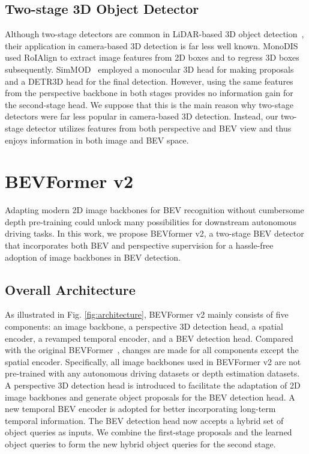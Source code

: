 \documentclass[10pt,twocolumn,letterpaper]{article}
\begin{document}
\subsection{Two-stage 3D Object Detector}
Although two-stage detectors are common in LiDAR-based 3D object detection~\cite{MV3D,AVOD,centerpoint,lidar-rcnn,frustum-pointnet,transfusion,SimMOD}, their application in camera-based 3D detection is far less well known. 
MonoDIS~\cite{MonoDIS} used RoIAlign to extract image features from 2D boxes and to regress 3D boxes subsequently.
SimMOD~\cite{SimMOD} employed a monocular 3D head for making proposals and a DETR3D \cite{DETR3D} head for the final detection.
However, using the same features from the perspective backbone in both stages provides no information gain for the second-stage head. 
We suppose that this is the main reason why two-stage detectors were far less popular in camera-based 3D detection. 
Instead, our two-stage detector utilizes features from both perspective and BEV view and thus enjoys information in both image and BEV space.

%
 \section{BEVFormer v2}
Adapting modern 2D image backbones for BEV recognition without cumbersome depth pre-training could unlock many possibilities for downstream autonomous driving tasks. 
In this work, we propose BEVformer v2, a two-stage BEV detector that incorporates both BEV and perspective supervision for a hassle-free adoption of image backbones in BEV detection.

\subsection{Overall Architecture} As illustrated in Fig. \ref{fig:architecture}, BEVFormer v2 mainly consists of five components: an image backbone, a perspective 3D detection head, a spatial encoder, a revamped temporal encoder, and a BEV detection head. 
Compared with the original BEVFormer~\cite{bevformer}, changes are made for all components except the spatial encoder.
Specifically, all image backbones used in BEVFormer v2 are not pre-trained with any autonomous driving datasets or depth estimation datasets. 
A perspective 3D detection head is introduced to facilitate the adaptation of 2D image backbones and generate object proposals for the BEV detection head.
A new temporal BEV encoder is adopted for better incorporating long-term temporal information.
The BEV detection head now accepts a hybrid set of object queries as inputs. We combine the first-stage proposals and the learned object queries to
form the new hybrid object queries for the second stage.
\end{document}
